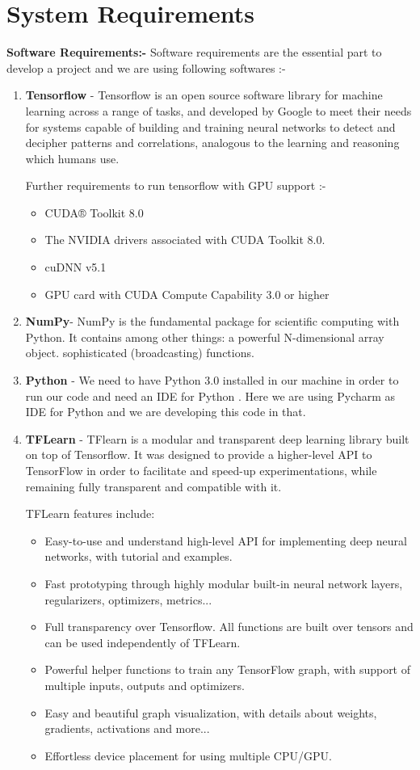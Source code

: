 \section{System Requirements}
\textbf{Software Requirements:-}  Software requirements are the essential part to develop a project and we are using following softwares :-

\begin{enumerate}
	\item \textbf{Tensorflow} - Tensorflow is an open source software library for machine learning across a range of tasks, and developed by Google to meet their needs for systems capable of building and training neural networks to detect and decipher patterns and correlations, analogous to the learning and reasoning which humans use.
	
	Further requirements to run tensorflow with GPU support :-
	\begin{itemize}
		\item CUDA® Toolkit 8.0
		\item The NVIDIA drivers associated with CUDA Toolkit 8.0.
		\newpage
		\item cuDNN v5.1
		\item GPU card with CUDA Compute Capability 3.0 or higher
	\end{itemize}

	\item \textbf{NumPy}- NumPy is the fundamental package for scientific computing with Python. It contains among other things: a powerful N-dimensional array object. sophisticated (broadcasting) functions.
	
	\item \textbf{Python} - We need to have Python 3.0 installed in our machine in order to run our code and need an IDE for Python . Here we are using Pycharm as IDE for Python and we are developing this code in that.
	
	\item \textbf{TFLearn} - TFlearn is a modular and transparent deep learning library built on top of Tensorflow. It was designed to provide a higher-level API to TensorFlow in order to facilitate and speed-up experimentations, while remaining fully transparent and compatible with it.
	
	TFLearn features include:
	\begin{itemize}
		\item Easy-to-use and understand high-level API for implementing deep neural networks, with tutorial and examples.
		\item Fast prototyping through highly modular built-in neural network layers, regularizers, optimizers, metrics...
		\item Full transparency over Tensorflow. All functions are built over tensors and can be used independently of TFLearn.
		\item Powerful helper functions to train any TensorFlow graph, with support of multiple inputs, outputs and optimizers.
		\item Easy and beautiful graph visualization, with details about weights, gradients, activations and more...
		\item Effortless device placement for using multiple CPU/GPU.
		

\end{itemize}
\end{enumerate}
